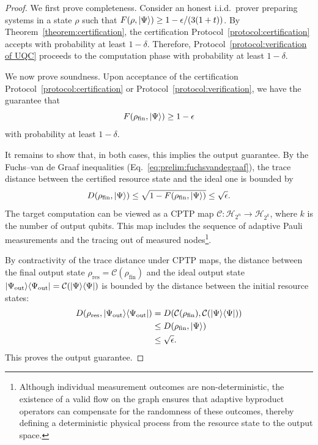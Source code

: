 \documentclass[a4paper,twocolumn,11pt,unpublished]{quantumarticle}
\newcommand{\ketbra}[1]{\ket{#1}\!\bra{#1}}
\begin{document}
\begin{proof}
    We first prove completeness. Consider an honest i.i.d.\ prover preparing systems in a state $\rho$ such that $F(\rho,\ket{\Psi})\geq 1-\epsilon/(3(1+t))$. By Theorem~\ref{theorem:certification}, the certification Protocol~\ref{protocol:certification} accepts with probability at least $1-\delta$. Therefore, Protocol~\ref{protocol:verification of UQC} proceeds to the computation phase with probability at least $1-\delta$.

    We now prove soundness. Upon acceptance of the certification Protocol~\ref{protocol:certification} or Protocol~\ref{protocol:verification}, we have the guarantee that
    \begin{equation}
        F(\rho_{\mathrm{fin}}, \ket\Psi) \geq 1-\epsilon
    \end{equation}
    with probability at least $1-\delta$.

    It remains to show that, in both cases, this implies the output guarantee. By the Fuchs--van de Graaf inequalities (Eq.~\eqref{eq:prelim:fuchsvandegraaf}), the trace distance between the certified resource state and the ideal one is bounded by
    \begin{equation}
        D(\rho_{\mathrm{fin}}, \ket\Psi) \leq \sqrt{1 - F(\rho_{\mathrm{fin}}, \ket\Psi)} \leq \sqrt{\epsilon}.
    \end{equation}
    The target computation can be viewed as a CPTP map $\mathcal{C}: \mathcal{H}_{2^n} \to \mathcal{H}_{2^k}$, where $k$ is the number of output qubits. This map includes the sequence of adaptive Pauli measurements and the tracing out of measured nodes\footnote{Although individual measurement outcomes are non-deterministic, the existence of a valid flow on the graph ensures that adaptive byproduct operators can compensate for the randomness of these outcomes, thereby defining a deterministic physical process from the resource state to the output space.}.

    By contractivity of the trace distance under CPTP maps, the distance between the final output state $\rho_{\mathrm{res}} = \mathcal{C}(\rho_{\mathrm{fin}})$ and the ideal output state $\ketbra{\Psi_{\rm out}} = \mathcal{C}(\ketbra{\Psi})$ is bounded by the distance between the initial resource states:
    \begin{align}
        D(\rho_{\mathrm{res}}, \ketbra{\Psi_{\rm out}})
        &= D(\mathcal{C}(\rho_{\mathrm{fin}}), \mathcal{C}(\ketbra{\Psi})) \nonumber \\
        &\leq D(\rho_{\mathrm{fin}}, \ket{\Psi}) \nonumber \\
        &\leq \sqrt{\epsilon}. \nonumber
    \end{align}
    This proves the output guarantee.
\end{proof}
\end{document}

